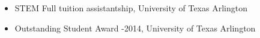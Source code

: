 \documentclass{my_cv}
\begin{document}
\vspace{-5pt} %
\begin{itemize} \itemsep -2pt 
\item STEM Full tuition assistantship, University of Texas Arlington \\
\item Outstanding Student Award -2014, University of Texas Arlington \\
\end{itemize}



\end{document}
